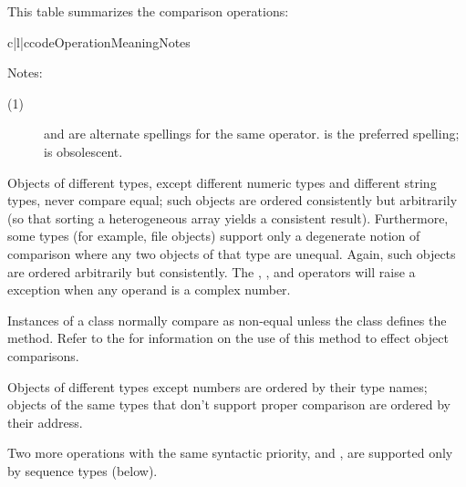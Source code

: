This table summarizes the comparison operations:

\begin{tableiii}{c|l|c}{code}{Operation}{Meaning}{Notes}
\end{tableiii}
\opindex{==} %

\noindent
Notes:

\begin{description}

\item[(1)]
\code{<>} and \code{!=} are alternate spellings for the same operator.
\code{!=} is the preferred spelling; \code{<>} is obsolescent.

\end{description}

Objects of different types, except different numeric types and different string types, never
compare equal; such objects are ordered consistently but arbitrarily
(so that sorting a heterogeneous array yields a consistent result).
Furthermore, some types (for example, file objects) support only a
degenerate notion of comparison where any two objects of that type are
unequal.  Again, such objects are ordered arbitrarily but
consistently. The \code{<}, \code{<=}, \code{>} and \code{>=}
operators will raise a  exception when any operand
is a complex number. 

Instances of a class normally compare as non-equal unless the class
defines the  method.  Refer to the
 for
information on the use of this method to effect object comparisons.

 Objects of different types except
numbers are ordered by their type names; objects of the same types
that don't support proper comparison are ordered by their address.

Two more operations with the same syntactic priority,
 and , are supported
only by sequence types (below).


